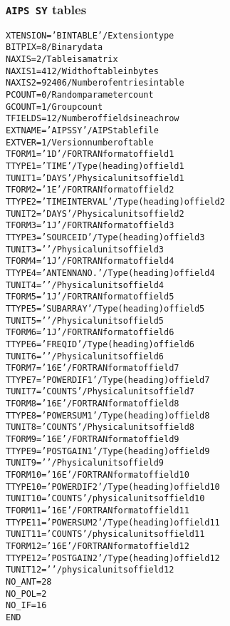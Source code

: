 \documentclass[twoside]{article}
\begin{document}
\subsubsection{{\tt AIPS SY} tables}
\label{Appe:SYtable}
\begin{alltt}
XTENSION= 'BINTABLE'           / Extension type
BITPIX  =                    8 / Binary data
NAXIS   =                    2 / Table is a matrix
NAXIS1  =                  412 / Width of table in bytes
NAXIS2  =                92406 / Number of entries in table
PCOUNT  =                    0 / Random parameter count
GCOUNT  =                    1 / Group count
TFIELDS =                   12 / Number of fields in each row
EXTNAME = 'AIPS SY '           / AIPS table file
EXTVER  =                    1 / Version number of table
TFORM1  = '1D      '           / FORTRAN format of field  1
TTYPE1  = 'TIME            '   / Type (heading) of field  1
TUNIT1  = 'DAYS    '           / Physical units of field  1
TFORM2  = '1E      '           / FORTRAN format of field  2
TTYPE2  = 'TIME INTERVAL   '   / Type (heading) of field  2
TUNIT2  = 'DAYS    '           / Physical units of field  2
TFORM3  = '1J      '           / FORTRAN format of field  3
TTYPE3  = 'SOURCE ID       '   / Type (heading) of field  3
TUNIT3  = '        '           / Physical units of field  3
TFORM4  = '1J      '           / FORTRAN format of field  4
TTYPE4  = 'ANTENNA NO.     '   / Type (heading) of field  4
TUNIT4  = '        '           / Physical units of field  4
TFORM5  = '1J      '           / FORTRAN format of field  5
TTYPE5  = 'SUBARRAY        '   / Type (heading) of field  5
TUNIT5  = '        '           / Physical units of field  5
TFORM6  = '1J      '           / FORTRAN format of field  6
TTYPE6  = 'FREQ ID         '   / Type (heading) of field  6
TUNIT6  = '        '           / Physical units of field  6
TFORM7  = '16E     '           / FORTRAN format of field  7
TTYPE7  = 'POWER DIF1      '   / Type (heading) of field  7
TUNIT7  = 'COUNTS  '           / Physical units of field  7
TFORM8  = '16E     '           / FORTRAN format of field  8
TTYPE8  = 'POWER SUM1      '   / Type (heading) of field  8
TUNIT8  = 'COUNTS  '           / Physical units of field  8
TFORM9  = '16E     '           / FORTRAN format of field  9
TTYPE9  = 'POST GAIN1      '   / Type (heading) of field  9
TUNIT9  = '        '           / Physical units of field  9
TFORM10 = '16E     '           / FORTRAN format of field 10
TTYPE10 = 'POWER DIF2      '   / Type (heading) of field 10
TUNIT10 = 'COUNTS  '           / physical units of field 10
TFORM11 = '16E     '           / FORTRAN format of field 11
TTYPE11 = 'POWER SUM2      '   / Type (heading) of field 11
TUNIT11 = 'COUNTS  '           / physical units of field 11
TFORM12 = '16E     '           / FORTRAN format of field 12
TTYPE12 = 'POST GAIN2      '   / Type (heading) of field 12
TUNIT12 = '        '           / physical units of field 12
NO_ANT  =           28
NO_POL  =            2
NO_IF   =           16
END
\end{alltt}
\end{document}
